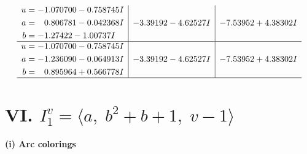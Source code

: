 \documentclass[1p]{elsarticle_modified}
\theoremstyle{definition}
\begin{document}
$$\begin{array}{c|c|c}
\begin{aligned}
u &= -1.070700 - 0.758745 I \\
a &= \phantom{-}0.806781 - 0.042368 I \\
b &= -1.27422 - 1.00737 I\end{aligned}
 & -3.39192 - 4.62527 I & -7.53952 + 4.38302 I \\ \hline\begin{aligned}
u &= -1.070700 - 0.758745 I \\
a &= -1.236090 - 0.064913 I \\
b &= \phantom{-}0.895964 + 0.566778 I\end{aligned}
 & -3.39192 - 4.62527 I & -7.53952 + 4.38302 I\\
 \hline 
 \end{array}$$\newpage\newpage\renewcommand{\arraystretch}{1}
\centering \section*{VI. $I^v_{1}= \langle a,\;b^2+b+1,\;v-1 \rangle$}
\flushleft \textbf{(i) Arc colorings}\\
\end{document}
